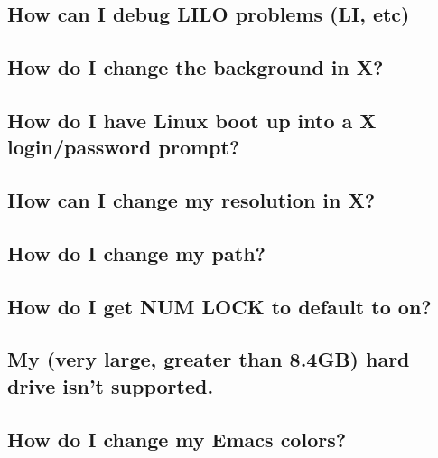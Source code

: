\documentclass[a4paper]{article}
\begin{document}
\subsection{How can I debug LILO problems (LI, etc)}






\subsection{How do I change the background in X?}






\subsection{How do I have Linux boot up into a X login/password prompt?}






\subsection{How can I change my resolution in X?}






\subsection{How do I change my path?}






\subsection{How do I get NUM LOCK to default to on?}






\subsection{My (very large, greater than 8.4GB) hard drive isn't supported.}






\subsection{How do I change my Emacs colors?}
\end{document}
